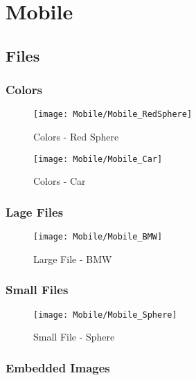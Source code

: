 
\section{Mobile}

    \subsection{Files}
    
        \subsubsection{Colors}

        \begin{figure}[H]
            \texttt{[image: Mobile/Mobile\_RedSphere]}
            \centering
            \caption{Colors - Red Sphere}
            \label{fig:mobileRedSphere}
        \end{figure}

        \begin{figure}[H]
            \texttt{[image: Mobile/Mobile\_Car]}
            \centering
            \caption{Colors - Car}
            \label{fig:mobileCar}
        \end{figure}
        
        \subsubsection{Lage Files}

            \begin{figure}[H]
                \texttt{[image: Mobile/Mobile\_BMW]}
                \centering
                \caption{Large File - BMW}
                \label{fig:mobileBMW}
            \end{figure}
    
        \subsubsection{Small Files}

        \begin{figure}[H]
            \texttt{[image: Mobile/Mobile\_Sphere]}
            \centering
            \caption{Small File - Sphere}
            \label{fig:mobileSphere}
        \end{figure}
        
        \subsubsection{Embedded Images}

